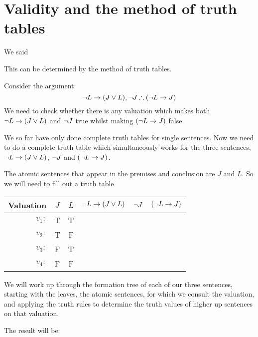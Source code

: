 \section{Validity and the method of truth tables}
We said




This can be determined by the method of truth tables.

Consider the argument:
$$\enot L \eif (J \eor L),\enot J\therefore (\enot L\eif J)$$
We need to check whether there is any valuation which makes both $\neg L \rightarrow (J \vee L)$ and $\neg J$ true whilst making $(\neg L\rightarrow J) $ false. 

We so far have only done complete truth tables for single sentences. Now we need to do a complete truth table which simultaneously works for the three sentences, $\neg L \rightarrow (J \vee L)$, $\neg J$ and $(\neg L\rightarrow J)$.


The atomic sentences that appear in the premises and conclusion are $J$ and $L$. So we will need to fill out a truth table

\begin{center}
	\begin{tabular}{rcc|c|c|c}
		Valuation&$J$&$L$&$\neg L \rightarrow (J \vee L)$&$\neg J$ & $(\neg L\rightarrow J)$\\\hline
		$v_1:$&T&T&&&\\
		$v_2:$&T&F&&&\\
		$v_3:$&F&T&&&\\
		$v_4:$&F&F&&
	\end{tabular}
\end{center}

We will work up through the formation tree of each of our three sentences, starting with the leaves, the atomic sentences, for which we consult the valuation, and applying the truth rules to determine the truth values of higher up sentences on that valuation. 

The result will be:

